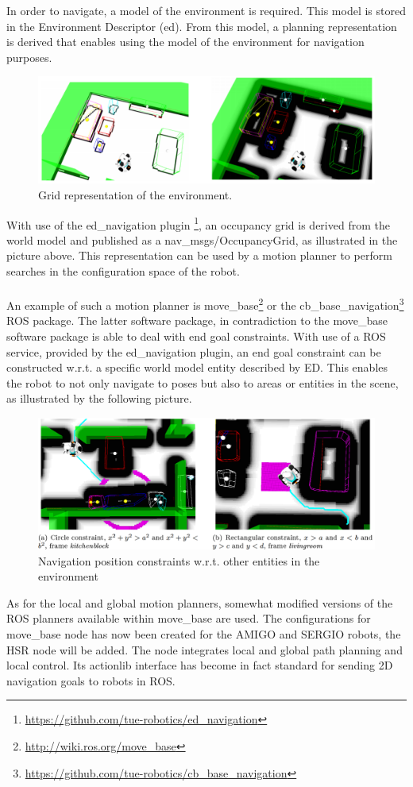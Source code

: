 In order to navigate, a model of the environment is required. This model is stored in the Environment Descriptor (\acrshort{ed}). From this model, a planning representation is derived that enables using the model of the environment for navigation purposes.
\begin{figure}[ht]
	\includegraphics[width = \linewidth]{Figures/ed_navigation}
	\caption{Grid representation of the environment.}
	\label{fig:ed_navigation}
\end{figure}
With use of the ed\_navigation plugin \footnote{\url{https://github.com/tue-robotics/ed_navigation}}, an occupancy grid is derived from the world model and published as a nav\_msgs/OccupancyGrid, as illustrated in the picture above. This representation can be used by a motion planner to perform searches in the configuration space of the robot.
\\\\
An example of such a motion planner is move\_base\footnote{\url{http://wiki.ros.org/move_base}} or the cb\_base\_navigation\footnote{\url{https://github.com/tue-robotics/cb_base_navigation}} ROS package. The latter software package, in contradiction to the move\_base software package is able to deal with end goal constraints. With use of a ROS service, provided by the ed\_navigation plugin, an end goal constraint can be constructed w.r.t. a specific world model entity described by ED. This enables the robot to not only navigate to poses but also to areas or entities in the scene, as illustrated by the following picture.
\begin{figure}[ht]
	\includegraphics[width = \linewidth]{Figures/ed_navigation_constraints}
	\caption{Navigation position constraints w.r.t. other entities in the environment}
	\label{fig:ed_navigation_constraints}
\end{figure}
As for the local and global motion planners, somewhat modified versions of the ROS planners available within move\_base are used.
The configurations for move\_base node has now been created for the AMIGO and SERGIO robots, the HSR node will be added. The node integrates local and global path planning and local control. Its actionlib interface has become in fact standard for sending 2D navigation goals to robots in ROS. 